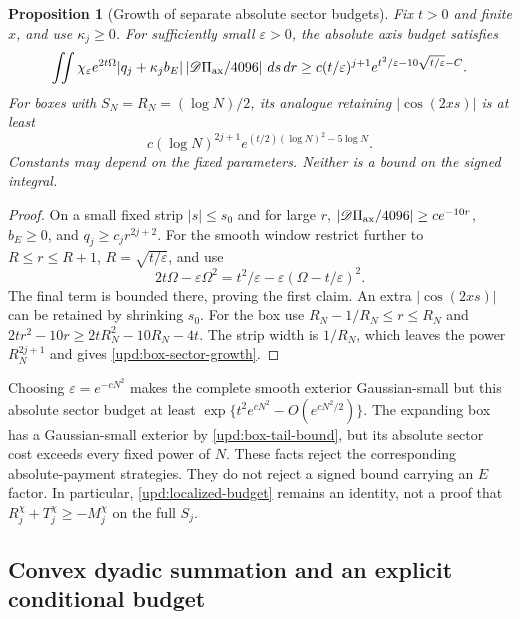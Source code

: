\documentclass[11pt]{article}
\numberwithin{equation}{section}
\newtheorem{proposition}[theorem]{Proposition}
\theoremstyle{definition}
\theoremstyle{remark}
\newcommand{\dd}{\,d}
\begin{document}
\begin{proposition}[Growth of separate absolute sector budgets]
\label{upd:absolute-sector-growth}
Fix $t>0$ and finite $x$, and use $\kappa_j\ge0$. For sufficiently
small $\varepsilon>0$, the absolute axis budget satisfies
\[
 \iint\chi_\varepsilon e^{2t\Omega}|q_j+\kappa_jb_E|
          \left|\mathscr D\Pi_{\rm ax}/4096\right|\dd s\dd r
 \ge c(t/\varepsilon)^{j+1}
       e^{t^2/\varepsilon-10\sqrt{t/\varepsilon}-C}.
\]
For boxes with $S_N=R_N=(\log N)/2$, its analogue retaining
$|\cos(2xs)|$ is at least
\begin{equation}
 c(\log N)^{2j+1}
             e^{(t/2)(\log N)^2-5\log N}.
 \label{upd:box-sector-growth}
\end{equation}
Constants may depend on the fixed parameters. Neither is a bound on
the signed integral.
\end{proposition}
\begin{proof}
On a small fixed strip $|s|\le s_0$ and for large $r$,
$|\mathscr D\Pi_{\rm ax}/4096|\ge ce^{-10r}$,
$b_E\ge0$, and $q_j\ge c_jr^{2j+2}$.
For the smooth window restrict further to
$R\le r\le R+1$, $R=\sqrt{t/\varepsilon}$, and use
\[
 2t\Omega-\varepsilon\Omega^2
       =t^2/\varepsilon-\varepsilon(\Omega-t/\varepsilon)^2.
\]
The final term is bounded there, proving the first claim.  An extra
$|\cos(2xs)|$ can be retained by shrinking $s_0$.
For the box use $R_N-1/R_N\le r\le R_N$ and
$2tr^2-10r\ge2tR_N^2-10R_N-4t$.  The strip width is $1/R_N$,
which leaves the power $R_N^{2j+1}$ and gives
\eqref{upd:box-sector-growth}.
\end{proof}

Choosing $\varepsilon=e^{-cN^2}$ makes the complete smooth exterior
Gaussian-small but this absolute sector budget at least
$\exp\{t^2e^{cN^2}-O(e^{cN^2/2})\}$.  The expanding box has a
Gaussian-small exterior by \eqref{upd:box-tail-bound}, but its absolute
sector cost exceeds every fixed power of $N$.  These facts reject the
corresponding absolute-payment strategies. They do not reject a signed
bound carrying an $E$ factor.  In particular,
\eqref{upd:localized-budget} remains an identity, not a proof that
$R_j^\chi+T_j^\chi\ge-M_j^\chi$ on the full $S_j$.

\subsection{Convex dyadic summation and an explicit conditional budget}
\end{document}
